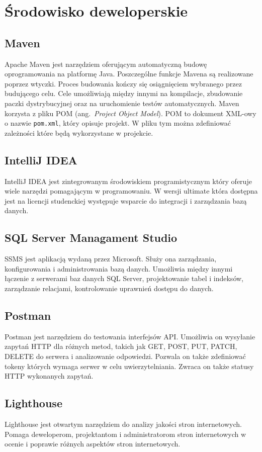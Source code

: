 \section{Środowisko deweloperskie}
\subsection{Maven}
Apache Maven jest narzędziem oferującym automatyczną budowę oprogramowania na platformę Java. Poszczególne funkcje Mavena są realizowane poprzez wtyczki. Proces budowania kończy się osiągnięciem wybranego przez budującego celu. Cele umożliwiają między innymi na kompilacje, zbudowanie paczki dystrybucyjnej oraz na uruchomienie testów automatycznych. Maven korzysta z pliku POM (ang.~\emph{Project Object Model}). POM to dokument XML-owy o nazwie \texttt{pom.xml}, który opisuje projekt. W pliku tym można zdefiniować zależności które będą wykorzystane w projekcie. 

\subsection{IntelliJ IDEA} %
IntelliJ IDEA jest zintegrowanym środowiskiem programistycznym który oferuje wiele narzędzi pomagającym w programowaniu. W wersji ultimate która dostępna jest na licencji studenckiej występuje wsparcie do integracji i zarządzania bazą danych.

\subsection{SQL Server Managament Studio}
\label{ssms:label}
SSMS jest aplikacją wydaną przez Microsoft. Służy ona zarządzania, konfigurowania i administrowania bazą danych. Umożliwia między innymi łączenie z serwerami baz danych SQL Server, projektowanie tabel i indeksów, zarządzanie relacjami, kontrolowanie uprawnień dostępu do danych.

\subsection{Postman}
Postman jest narzędziem do testowania interfejsów API. Umożliwia on wysyłanie zapytań HTTP dla różnych metod, takich jak GET, POST, PUT, PATCH, DELETE do serwera i analizowanie odpowiedzi. Pozwala on także zdefiniować tokeny których wymaga serwer w celu uwierzytelniania. Zwraca on także statusy HTTP wykonanych zapytań.

\subsection{Lighthouse}
Lighthouse jest otwartym narzędziem do analizy jakości stron internetowych. Pomaga deweloperom, projektantom i administratorom stron internetowych w ocenie i poprawie różnych aspektów stron internetowych.

